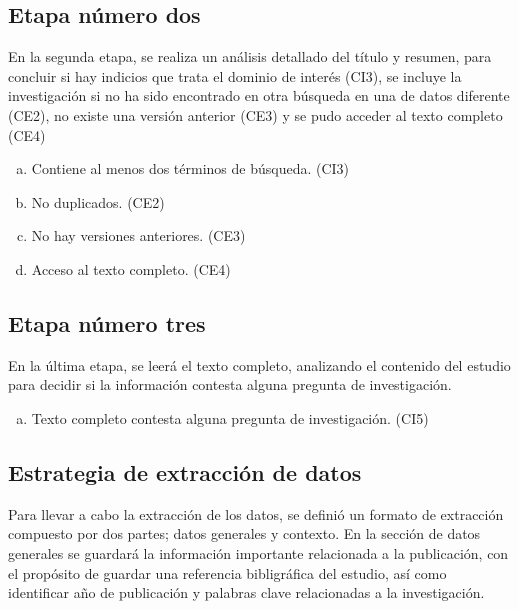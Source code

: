 \documentclass[conference,onecolumn,10pt]{IEEEtran}
\begin{document}
\subsection{Etapa número dos}
En la segunda etapa, se realiza un análisis detallado del título y resumen, para 
concluir si hay indicios que trata el dominio de interés (CI3), se incluye 
la investigación si no ha sido encontrado en otra búsqueda en una de datos diferente (CE2), 
no existe una versión anterior (CE3) y se pudo acceder al texto completo (CE4)

\begin{enumerate}[(a)]
  \item{Contiene al menos dos términos de búsqueda. (CI3)}
  \item{No duplicados. (CE2)}
  \item{No hay versiones anteriores. (CE3) }
  \item{Acceso al texto completo. (CE4)}
\end{enumerate}

\subsection{Etapa número tres}
En la última etapa, se leerá el texto completo, analizando el contenido del estudio para decidir si 
la información contesta alguna pregunta de investigación. 
\begin{enumerate}[(a)]
  \item{Texto completo contesta alguna pregunta de investigación. (CI5)}
\end{enumerate}
\newpage

\subsection{Estrategia de extracción de datos}
Para llevar a cabo la extracción de los datos, se definió un formato de extracción compuesto por dos partes; datos generales y contexto.
En la sección de datos generales se guardará la información importante relacionada a la publicación, con el propósito de guardar 
una referencia bibligráfica del estudio, así como identificar año de publicación y palabras clave relacionadas a la investigación. 
\end{document}
